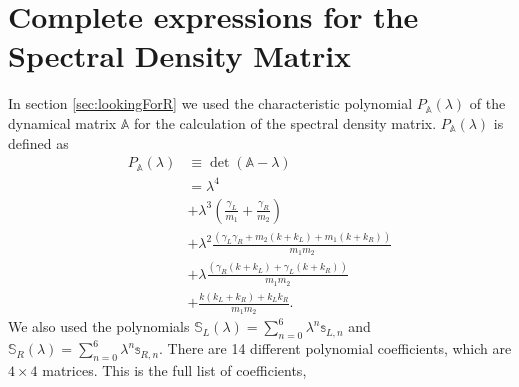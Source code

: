 
\chapter{Complete expressions for the Spectral Density Matrix}
\label{Appendix:SpectralDensity}

%
In section \ref{sec:lookingForR} we used the characteristic polynomial $P_{\mathbb{A}}(\lambda)$ of the dynamical matrix $\mathbb{A}$ for the calculation of the spectral density matrix. $P_{\mathbb{A}}(\lambda)$ is defined as
\begin{equation}
  \begin{split}
    P_{\mathbb{A}}(\lambda) &\equiv\det(\mathbb{A}-\lambda)\\
    &= \lambda ^4 \\&+ \lambda ^3 \left(\frac{\gamma_L}{m_1}+\frac{\gamma_R}{m_2}\right) \\ &+ \lambda^2\frac{ (\gamma_L \gamma_R+m_2 (k+k_L)+m_1 (k+k_R))}{m_1 m_2}\\ &+ \lambda \frac{  (\gamma_R (k+k_L)+\gamma_L (k+k_R))}{m_1 m_2}\\ &+\frac{k (k_L+k_R)+k_L k_R}{m_1 m_2}.
  \end{split}
\end{equation}
%
We also used the polynomials  $\mathbb{S}_L(\lambda)=\sum\limits_{n=0}^6 \lambda^n \mathbb{s}_{L,n}$ and $\mathbb{S}_R(\lambda)=\sum\limits_{n=0}^6 \lambda^n \mathbb{s}_{R,n}$. There are 14 different polynomial coefficients, which are $4\times 4$ matrices. This is the full list of coefficients,
%
\begingroup
\allowdisplaybreaks
